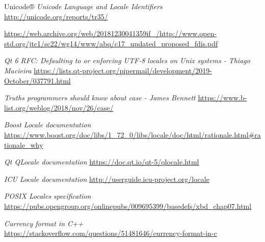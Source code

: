 \documentclass{wg21}
\begin{document}
\renewcommand{\section}[2]{}%
\begin{thebibliography}{9}
    \nocite{N4830}
    
    Unicode®
    \emph{Unicode Language and Locale Identifiers}\newline
    \url{http://unicode.org/reports/tr35/}

    \url{https://web.archive.org/web/20181230041359if_/http://www.open-std.org/jtc1/sc22/wg14/www/abq/c17_updated_proposed_fdis.pdf}  
       
    \emph{Qt 6 RFC: Defaulting to or enforcing UTF-8 locales on Unix systems - Thiago Macieira }\newline
    \url{https://lists.qt-project.org/pipermail/development/2019-October/037791.html}    
    
    
    \emph{Truths programmers should know about case -  James Bennett}\newline
    \url{https://www.b-list.org/weblog/2018/nov/26/case/}
    
    \emph{Boost Locale documentation}\newline
    \url{https://www.boost.org/doc/libs/1_72_0/libs/locale/doc/html/rationale.html#rationale_why}
    
    \emph{Qt QLocale documentation}\newline
    \url{https://doc.qt.io/qt-5/qlocale.html} 
    
    
    \emph{ICU Locale documentation}\newline
    \url{http://userguide.icu-project.org/locale} 
    
    \emph{POSIX Locales specification}\newline
    \url{https://pubs.opengroup.org/onlinepubs/009695399/basedefs/xbd_chap07.html}
    
    
    \emph{Currency format in C++}\newline
    \url{https://stackoverflow.com/questions/51481646/currency-format-in-c}
     
\end{thebibliography}
\end{document}
